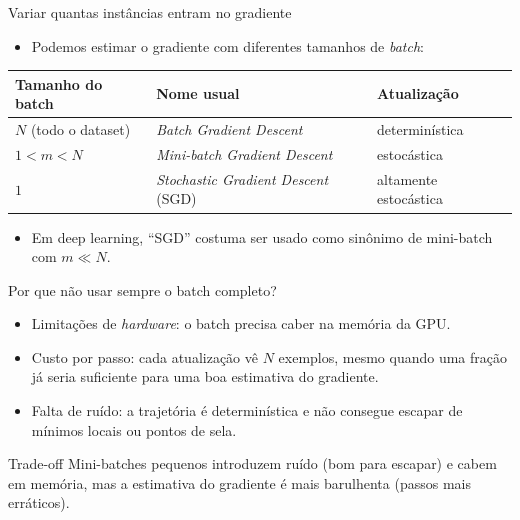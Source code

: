 \documentclass[aspectratio=169,xcolor=dvipsnames]{beamer}
\begin{document}
  \begin{frame}{Variar quantas instâncias entram no gradiente}
    \begin{itemize}
      \item Podemos estimar o gradiente com diferentes tamanhos de \textit{batch}:
    \end{itemize}
    \vfill
    \begin{center}
      \begin{tabular}{@{}lll@{}}
        \toprule
        Tamanho do batch & Nome usual & Atualização \\
        \midrule
        $N$ (todo o dataset) & \textit{Batch Gradient Descent} & determinística \\
        $1<m<N$ & \textit{Mini-batch Gradient Descent} & estocástica \\
        $1$ & \textit{Stochastic Gradient Descent} (SGD) & altamente estocástica \\
        \bottomrule
      \end{tabular}
    \end{center}
    \vfill
    \begin{itemize}
      \item Em deep learning, ``SGD'' costuma ser usado como sinônimo de mini-batch
        com $m\ll N$.
    \end{itemize}
  \end{frame}

  \begin{frame}{Por que não usar sempre o batch completo?}
    \begin{itemize}
      \item Limitações de \textit{hardware}: o batch precisa caber na memória da GPU.
      \item Custo por passo: cada atualização vê $N$ exemplos, mesmo quando uma fração já
        seria suficiente para uma boa estimativa do gradiente.
      \item Falta de ruído: a trajetória é determinística e não consegue escapar de mínimos
        locais ou pontos de sela.
    \end{itemize}
    \vfill
    \begin{block}{Trade-off}
      Mini-batches pequenos introduzem ruído (bom para escapar) e cabem em memória,
      mas a estimativa do gradiente é mais barulhenta (passos mais erráticos).
    \end{block}
  \end{frame}
\end{document}
